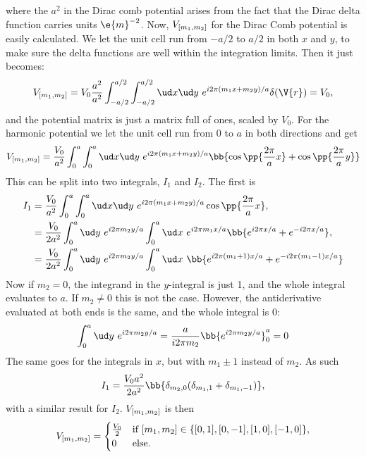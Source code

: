 \documentclass[main.tex]{subfiles}
\begin{document}
	where the $ a^2 $ in the Dirac comb potential arises from the fact that the Dirac delta function carries units $ \e{m}^{-2} $. Now, $ V_{[m_1, m_2]} $ for the Dirac Comb potential is easily calculated. We let the unit cell run from $ -a/2 $ to $ a/2 $ in both $ x $ and $ y $, to make sure the delta functions are well within the integration limits. Then it just becomes:
	\begin{equation}
		V\coef{m_1, m_2} = V_0 \frac{a^2}{a^2} \int_{-a/2}^{a/2} \int_{-a/2}^{a/2} \ud x \ud y \ e^{i 2\pi (m_1 x + m_2 y)/a} \delta(\V{r}) = V_0,
	\end{equation}
	and the potential matrix is just a matrix full of ones, scaled by $ V_0 $. For the harmonic potential we let the unit cell run from $ 0 $ to $ a $ in both directions and get
	\begin{equation}
		V\coef{m_1, m_2} = \frac{V_0}{a^2} \int_{0}^{a} \int_0^a \ud x \ud y \ e^{i 2\pi(m_1x + m_2y)/a} \bb{\cos\pp{\frac{2\pi}{a} x} + \cos\pp{\frac{2\pi}{a} y}}
	\end{equation}
	This can be split into two integrals, $ I_1 $ and $ I_2 $. The first is
	\begin{align}
		I_1 &=  \frac{V_0}{a^2} \int_{0}^{a} \int_0^a \ud x \ud y \ e^{i 2\pi(m_1x + m_2y)/a}\cos\pp{\frac{2\pi}{a} x}, \\
		&= \frac{V_0}{2a^2} \int_{0}^{a} \ud y\ e^{i 2\pi m_2 y / a} \int_{0}^{a} \ud x \ e^{i 2\pi m_1 x/a} \bb{e^{i 2\pi x/a} + e^{-i 2\pi x/a}}, \\
		&= \frac{V_0}{2a^2} \int_0^a \ud y\  e^{i 2\pi m_2 y / a} \int_{0}^{a} \ud x\ \bb{e^{i 2\pi(m_1+1) x/a} + e^{-i 2\pi (m_1-1)x/a}}
	\end{align}
	Now if $ m_2 = 0 $, the integrand in the $ y $-integral is just 1, and the whole integral evaluates to $ a $. If $ m_2 \neq 0 $ this is not the case. However, the antiderivative evaluated at both ends is the same, and the whole integral is 0:
	\begin{equation}
		\int_{0}^{a} \ud y\ e^{i 2\pi m_2 y/a} = \frac{a}{i 2\pi m_2} \bb{e^{i2\pi m_2 y /a}}_0^a = 0
	\end{equation}
	The same goes for the integrals in $ x $, but with $ m_1 \pm 1 $ instead of $ m_2 $. As such
	\begin{equation}
		I_1 = \frac{V_0 a^2}{2 a^2} \bb{\delta_{m_2,0} (\delta_{m_1, 1} + \delta_{m_1, -1})},
	\end{equation}
	with a similar result for $ I_2 $. $ V_{[m_1, m_2]} $ is then
	\begin{equation}
		V_{[m_1, m_2]} = \begin{cases}
			\frac{V_0}{2} 	& \text{if } [m_1, m_2] \in \{[0,1], [0,-1], [1,0], [-1,0]\}, \\
			0					& \text{else}.
		\end{cases}
	\end{equation}
\end{document}
